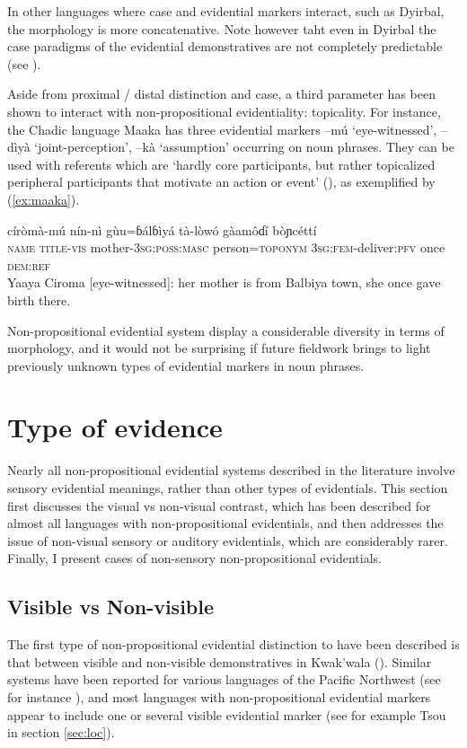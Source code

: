 \documentclass[oneside,a4paper,11pt]{article}
\newcommand{\ipa}[1]{{\phon \mbox{#1}}} %
\begin{document}
In other languages where case and evidential markers interact, such as Dyirbal, the morphology is more concatenative. Note however taht even in Dyirbal the case paradigms of the evidential demonstratives are not completely predictable (see \citealt{dixon14nonvisible}).

Aside from proximal / distal distinction and case, a third parameter has been shown to interact with non-propositional evidentiality: topicality. For instance,  the Chadic language Maaka has three evidential markers \ipa{--mú} `eye-witnessed', \ipa{--dìyà} `joint-perception', \ipa{--kà} `assumption' occurring on noun phrases. They can be used with referents which are `hardly core participants, but rather topicalized peripheral participants that motivate an action or event' (\citealt[195-7]{storch14maaka}), as exemplified by (\ref{ex:maaka}).

\begin{exe}
\ex \label{ex:maaka}
\gll \ipa{yáayà} \ipa{círòmà-mú} \ipa{nín-nì} \ipa{gùu=ɓálɓìyá} \ipa{tà-lòwó} \ipa{gàamôɗí} \ipa{bòɲcéttí} \\
\textsc{name} \textsc{title-vis} mother-\textsc{3sg:poss:masc} person=\textsc{toponym} \textsc{3sg:fem}-deliver:\textsc{pfv} once \textsc{dem:ref} \\
\glt Yaaya Ciroma [eye-witnessed]: her mother is from Balbiya town, she once gave birth there.
\end{exe}

Non-propositional evidential system display a considerable diversity in terms of morphology, and it would not be surprising if future fieldwork brings to light previously unknown types of evidential markers in noun phrases.

\section{Type of evidence} \label{sec:type}
Nearly all non-propositional evidential systems described in the literature   involve sensory evidential meanings, rather than other types of evidentials. This section first discusses the visual vs non-visual contrast, which has been described for almost all languages with non-propositional evidentials, and then addresses the issue of non-visual sensory or auditory evidentials, which are considerably rarer. Finally, I present cases of non-sensory non-propositional evidentials.

\subsection{Visible vs Non-visible} \label{sec:visible}
The first type of non-propositional evidential distinction to have been described  is that between visible and non-visible demonstratives in Kwak'wala (\citealt[527-531]{boas11kwakiutl}). Similar systems have been reported for various languages of the Pacific Northwest (see for instance \citealt{bach06deixis.wakashan}), and most languages with non-propositional evidential markers appear to include one or several visible evidential marker (see for example Tsou in section \ref{sec:loc}).  
\end{document}
